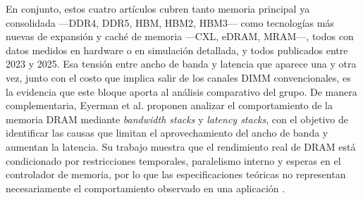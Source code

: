 
En conjunto, estos cuatro artículos cubren tanto memoria principal ya consolidada ---DDR4,
DDR5, HBM, HBM2, HBM3--- como tecnologías más nuevas de expansión y caché de memoria
---CXL, eDRAM, MRAM---, todos con datos medidos en hardware o en simulación detallada, y
todos publicados entre 2023 y 2025. Esa tensión entre ancho de banda y latencia que aparece una
y otra vez, junto con el costo que implica salir de los canales DIMM convencionales, es la
evidencia que este bloque aporta al análisis comparativo del grupo.
De manera complementaria, Eyerman et al. proponen analizar el comportamiento
de la memoria DRAM mediante \textit{bandwidth stacks} y \textit{latency stacks},
con el objetivo de identificar las causas que limitan el aprovechamiento del
ancho de banda y aumentan la latencia. Su trabajo muestra que el rendimiento
real de DRAM está condicionado por restricciones temporales, paralelismo interno
y esperas en el controlador de memoria, por lo que las especificaciones teóricas
no representan necesariamente el comportamiento observado en una aplicación
\cite{eyerman2022dram}.